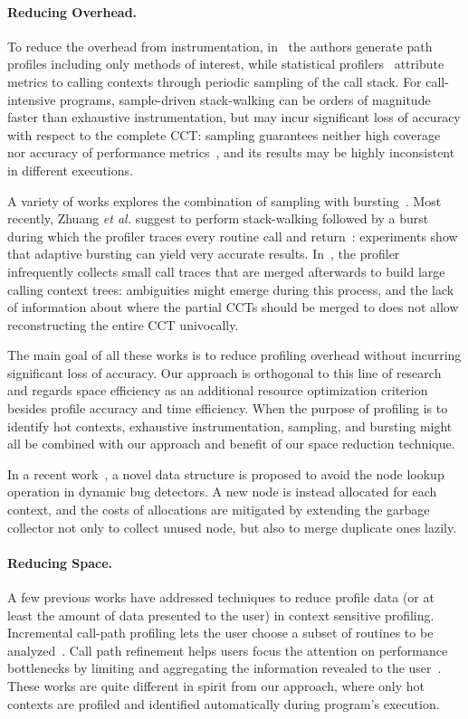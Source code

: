 \paragraph*{Reducing Overhead.} To reduce the overhead from instrumentation, in~\cite{Bernat07} the authors generate path profiles including only methods of interest, while statistical profilers~\cite{Arnold00,Froyd05,Hall93,Whaley00} attribute metrics to calling contexts through periodic sampling of the call stack. For call-intensive programs, sample-driven stack-walking can be orders of magnitude faster than exhaustive instrumentation, but may incur significant loss of accuracy with respect to the complete CCT: sampling guarantees neither high coverage~\cite{Bond07} nor accuracy of performance metrics~\cite{Zhuang06}, and its results may be highly inconsistent in different executions.

A variety of works explores the combination of sampling with bursting~\cite{Arnold01,Hirzel01,Zhuang06}. Most recently, Zhuang {\em et al.} suggest to perform stack-walking followed by a burst during which the profiler traces every routine call and return~\cite{Zhuang06}: experiments show that adaptive bursting can yield very accurate results. In~\cite{Serrano09}, the profiler infrequently collects small call traces that are merged afterwards to build large calling context trees: ambiguities might emerge during this process, and the lack of information about where the partial CCTs should be merged to does not allow reconstructing the entire CCT univocally.

The main goal of all these works is to reduce profiling overhead without incurring significant loss of accuracy. Our approach is orthogonal to this line of research and regards space efficiency as an additional resource optimization criterion besides profile accuracy and time efficiency. When the purpose of profiling is to identify hot contexts, exhaustive instrumentation, sampling, and bursting might all be combined with our approach and benefit of our space reduction technique.

In a recent work~\cite{Huang13}, a novel data structure is proposed to avoid the node lookup operation in dynamic bug detectors. A new node is instead allocated for each context, and the costs of allocations are mitigated by extending the garbage collector not only to collect unused node, but also to merge duplicate ones lazily.

\paragraph*{Reducing Space.} A few previous works have addressed techniques to reduce profile data (or at least the amount of data presented to the user) in context sensitive profiling. Incremental call-path profiling lets the user choose a subset of routines to be analyzed~\cite{Bernat07}. Call path refinement helps users focus the attention on performance bottlenecks by limiting and aggregating the information revealed to the user~\cite{Hall95}. These works are quite different in spirit from our approach, where only hot contexts are profiled and identified automatically during program's execution.

